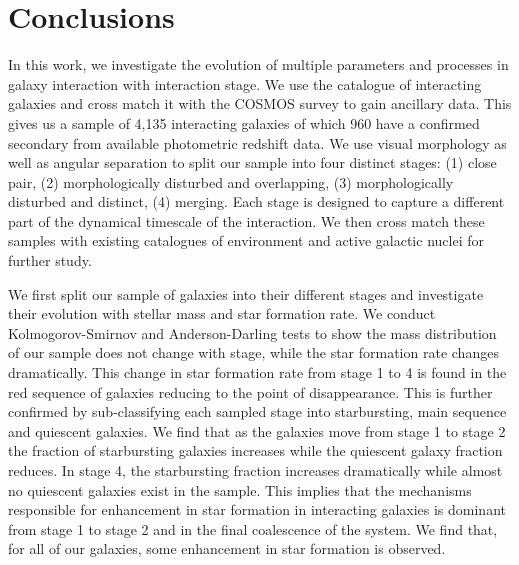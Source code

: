 \section{Conclusions}\label{conclusion}
\noindent In this work, we investigate the evolution of multiple parameters and processes in galaxy interaction with interaction stage. We use the \citet{2023ApJ...948...40O} catalogue of interacting galaxies and cross match it with the COSMOS survey to gain ancillary data. This gives us a sample of 4,135 interacting galaxies of which 960 have a confirmed secondary from available photometric redshift data. We use visual morphology as well as angular separation to split our sample into four distinct stages: (1) close pair, (2) morphologically disturbed and overlapping, (3) morphologically disturbed and distinct, (4) merging. Each stage is designed to capture a different part of the dynamical timescale of the interaction. We then cross match these samples with existing catalogues of environment and active galactic nuclei for further study.

We first split our sample of galaxies into their different stages and investigate their evolution with stellar mass and star formation rate. We conduct Kolmogorov-Smirnov and Anderson-Darling tests to show the mass distribution of our sample does not change with stage, while the star formation rate changes dramatically. This change in star formation rate from stage 1 to 4 is found in the red sequence of galaxies reducing to the point of disappearance. This is further confirmed by sub-classifying each sampled stage into starbursting, main sequence and quiescent galaxies. We find that as the galaxies move from stage 1 to stage 2 the fraction of starbursting galaxies increases while the quiescent galaxy fraction reduces. In stage 4, the starbursting fraction increases dramatically while almost no quiescent galaxies exist in the sample. This implies that the mechanisms responsible for enhancement in star formation in interacting galaxies is dominant from stage 1 to stage 2 and in the final coalescence of the system. We find that, for all of our galaxies, some enhancement in star formation is observed. 

